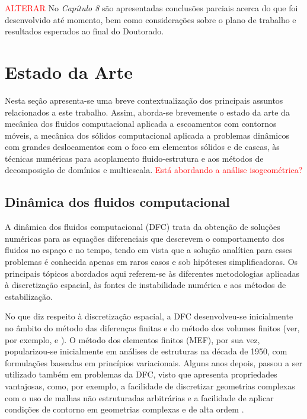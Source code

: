 \documentclass[tese_patricia.tex]{subfiles}
\begin{document}
\textcolor{red}{ALTERAR} No \textit{Capítulo 8} são apresentadas conclusões parciais acerca do que foi desenvolvido até momento, bem como considerações sobre o plano de trabalho e resultados esperados ao final do Doutorado.


\section[Beve Apanhado do Estado da Arte]{Estado da Arte}\label{section:estado_da_arte}

Nesta seção apresenta-se uma breve contextualização dos principais assuntos relacionados a este trabalho. Assim, aborda-se brevemente o estado da arte da mecânica dos fluidos computacional aplicada a escoamentos com contornos móveis, a mecânica dos sólidos computacional aplicada a problemas dinâmicos com grandes deslocamentos com o foco em elementos sólidos e de cascas, às técnicas numéricas para acoplamento fluido-estrutura e aos métodos de decomposição de domínios e multiescala. \textcolor{red}{Está abordando a análise isogeométrica?}

\subsection{Dinâmica dos fluidos computacional}
\label{cfdsection}

A dinâmica dos fluidos computacional (DFC) trata da obtenção de soluções numéricas para as  equações diferenciais que descrevem o comportamento dos fluidos no espaço e no tempo, tendo em vista que a solução analítica para esses problemas é conhecida apenas em raros casos e sob hipóteses simplificadoras. Os principais tópicos abordados aqui referem-se às diferentes metodologias aplicadas à discretização espacial, às fontes de instabilidade numérica e aos métodos de estabilização.

No que diz respeito à discretização espacial, a DFC desenvolveu-se inicialmente no âmbito do método das diferenças finitas e do método dos volumes finitos (ver, por exemplo,  e ). O método dos elementos finitos (MEF), por sua vez, popularizou-se inicialmente em análises de estruturas na década de 1950, com formulações baseadas em princípios variacionais. Alguns anos depois, passou a ser utilizado também em problemas da DFC, visto que apresenta propriedades vantajosas, como, por exemplo, a facilidade de discretizar geometrias complexas com o uso de malhas não estruturadas arbitrárias e a facilidade de aplicar condições de contorno em geometrias complexas e de alta ordem \cite{ZienkiewiczTN:2005,ReddyG:2000}.
\end{document}
